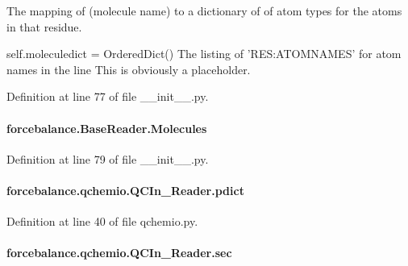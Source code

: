 The mapping of (molecule name) to a dictionary of of atom types for the atoms in that residue. 

self.\-moleculedict = Ordered\-Dict() The listing of 'R\-E\-S\-:A\-T\-O\-M\-N\-A\-M\-E\-S' for atom names in the line This is obviously a placeholder. 

Definition at line 77 of file \-\_\-\-\_\-init\-\_\-\-\_\-.\-py.

\hypertarget{classforcebalance_1_1BaseReader_a4369b5fb663a83b11602daa71db6862e}{
\paragraph[{Molecules}]{\setlength{\rightskip}{0pt plus 5cm}forcebalance.\-Base\-Reader.\-Molecules\hspace{0.3cm}{\ttfamily [inherited]}}}\label{classforcebalance_1_1BaseReader_a4369b5fb663a83b11602daa71db6862e}


Definition at line 79 of file \-\_\-\-\_\-init\-\_\-\-\_\-.\-py.

\hypertarget{classforcebalance_1_1qchemio_1_1QCIn__Reader_a8164f42ffde838198f885a133c367941}{
\paragraph[{pdict}]{\setlength{\rightskip}{0pt plus 5cm}forcebalance.\-qchemio.\-Q\-C\-In\-\_\-\-Reader.\-pdict}}\label{classforcebalance_1_1qchemio_1_1QCIn__Reader_a8164f42ffde838198f885a133c367941}


Definition at line 40 of file qchemio.\-py.

\hypertarget{classforcebalance_1_1qchemio_1_1QCIn__Reader_adec1bddb76f9cb96812814181986b95c}{
\paragraph[{sec}]{\setlength{\rightskip}{0pt plus 5cm}forcebalance.\-qchemio.\-Q\-C\-In\-\_\-\-Reader.\-sec}}\label{classforcebalance_1_1qchemio_1_1QCIn__Reader_adec1bddb76f9cb96812814181986b95c}


